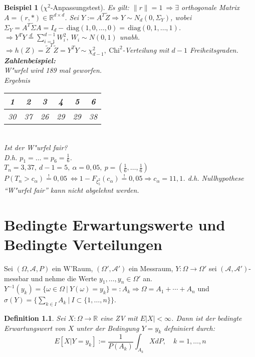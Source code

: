 \documentclass[a4paper,11pt]{scrbook}
\newcommand{\R}{{\mathbb R}}
\newcommand{\diag}{\ensuremath{\,\text{diag}}}
\def\AA{ \mathcal{A} }
\newtheorem*{DefON}{Definition}
\newtheorem{Bsp}{Beispiel}[chapter]
\theoremstyle{nonumberplain}
\begin{document}
\begin{Bsp}[$\chi^2$-Anpassungstest]
Es gilt: $\|r\| = 1\ \Rightarrow \exists$ orthogonale Matrix $A = (r, \ast) \in \R^{d \times d}$. Sei $Y := A^T \tilde{Z} \Rightarrow Y \sim N_d(0, \Sigma_Y)$, wobei $\Sigma_Y = A^T \tilde{\Sigma} A = I_d - \diag(1,0,\dots,0) = \diag (0,1,\dots,1)$.\\
$\Rightarrow Y^T Y \stackrel{d}{=} \sum_{i=1}^{d-1} W_i^2,\ W_i \sim N(0,1)$ unabh. $\Rightarrow h(Z) = \tilde{Z}^T \tilde{Z} = Y^T Y \sim \chi_{d-1}^2,\ \text{Chi}^2$-Verteilung mit $d-1$ Freiheitsgraden.\\
\textbf{Zahlenbeispiel:}\\
W"urfel wird 189 mal geworfen.\\
Ergebnis
\begin{tabular}{|c|c|c|c|c|c|}
1 & 2 & 3 & 4 & 5 & 6 \\
\hline
30 & 37 & 26 & 29 & 29 & 38
\end{tabular}\\
Ist der W"urfel fair?\\
D.h. $p_1 = \dots = p_6 = \frac16$.\\
$T_n = 3,37,\ d-1 = 5,\ \alpha = 0,05,\ p = (\frac16,\dots,\frac16)$\\
$P(T_n > c_{\alpha}) \stackrel{!}{=} 0,05 \ \Leftrightarrow 1 - F_{\xi_5^2}(c_{\alpha}) \stackrel{!}{=} 0,05 \Rightarrow c_{\alpha} = 11,1$. d.h. Nullhypothese "`W"urfel fair"' kann nicht abgelehnt werden.
\end{Bsp}

\chapter{Bedingte Erwartungswerte und Bedingte Verteilungen}
Sei $(\Omega,\AA,P)$ ein W'Raum, $(\Omega',\AA')$ ein Messraum, $Y: \Omega \rightarrow \Omega'$ sei $(\AA,\AA')$-messbar und nehme die Werte $y_1,\dots,y_n \in \Omega'$ an. $Y^{-1}(y_k) = \{ \omega \in \Omega\ |\ Y(\omega) = y_k \} =: A_k \Rightarrow \Omega = A_1 + \cdots + A_n$ und $\sigma(Y) = \{ \sum_{k \in I} A_k\ |\ I \subset \{1,\dots,n\} \}$.

\begin{DefON}
Sei $X: \Omega \rightarrow \R$ eine ZV mit $E|X| < \infty$. Dann ist der bedingte Erwartungswert von $X$ unter der Bedingung $Y = y_k$ defniniert durch:
\[
E[X | Y = y_k ] := \frac1{P(A_k)} \int_{A_k} X dP, \quad k = 1,\dots,n
\]
\end{DefON}

\end{document}
